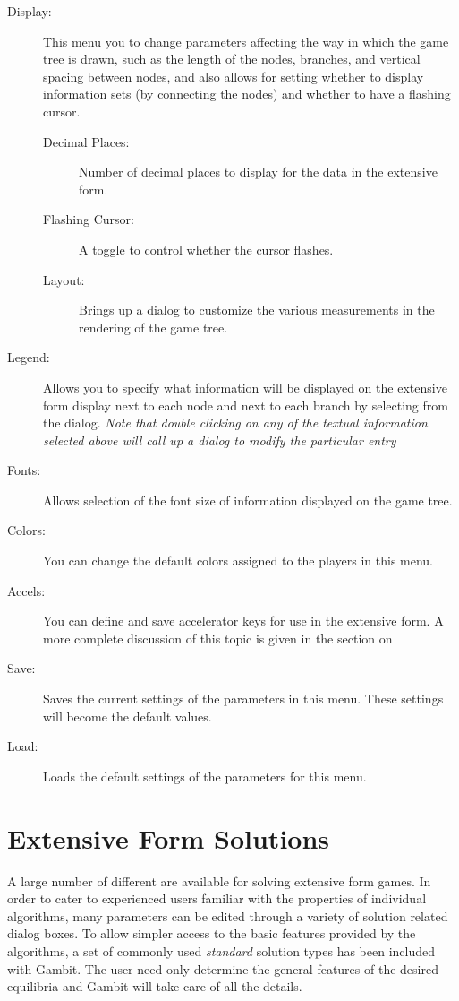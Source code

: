 \documentclass[12pt]{report}
\begin{document}
\begin{description}
\item[Display:] This menu you to change parameters affecting the way
in which the game tree is drawn, such as the length of the nodes,
branches, and vertical spacing between nodes, and also allows for
setting whether to display information sets (by connecting the nodes)
and whether to have a flashing cursor.
\begin{description}
\item[Decimal Places:] Number of decimal places to display for the data in the extensive form.  
\item[Flashing Cursor:] A toggle to control whether the cursor
flashes.
\item[Layout:] Brings up a dialog to customize the various measurements in the rendering of the game tree.  
\end{description}
\item[Legend:] Allows you to specify what information will be
displayed on the extensive form display next to each node and next to
each branch by selecting from the  dialog.  
{\em Note that double clicking on any of the textual information selected 
above will call up a dialog to modify the particular entry}
\item[Fonts:] Allows selection of the font size of information
displayed on the game tree.
\item[Colors:] You can change the default colors assigned to the
players in this menu.
\item[Accels:] You can define and save accelerator keys for use in the
extensive form. A more complete discussion of this topic is given in
the section on 
\item[Save:] Saves the current settings of the parameters in this menu.  These settings will become the default values.
\item[Load:] Loads the default settings of the parameters for this
menu.
\end{description}

\section{Extensive Form Solutions}\label{ExtensiveFormSolutions}

A large number of different  
are available for solving extensive form games.  In order to cater to
experienced users familiar with the properties of individual
algorithms, many parameters can be edited through a variety of
solution related dialog boxes.  To allow simpler access to the basic
features provided by the algorithms, a set of commonly used {\em
standard} solution types has been included with Gambit.  The user need
only determine the general features of the desired equilibria and
Gambit will take care of all the details.
\end{document}
